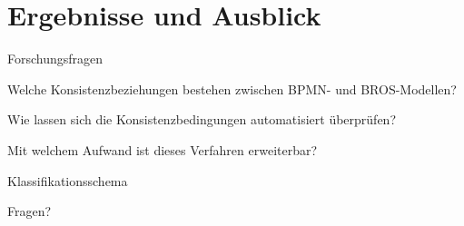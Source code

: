 \section{Ergebnisse und Ausblick}

\begin{frame}{Forschungsfragen}
  \begin{description}[4cm]
    \item[F1] Welche Konsistenzbeziehungen bestehen zwischen BPMN- und BROS-Modellen?

    \item[F2] Wie lassen sich die Konsistenzbedingungen automatisiert überprüfen?

    \item[F3] Mit welchem Aufwand ist dieses Verfahren erweiterbar?
  \end{description}
\end{frame}

\begin{frame}{Klassifikationsschema}
  
\end{frame}

\begin{frame}[standout]
  Fragen?
\end{frame}
